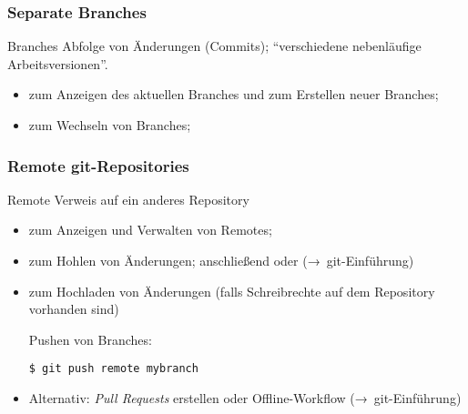 \documentclass{cms-kurs}
\begin{document}
\begin{frame}
  \frametitle{Separate Branches}

  \onslide<+->

  \begin{block}{Branches}
    Abfolge von Änderungen (Commits); \enquote{verschiedene nebenläufige
      Arbeitsversionen}.
  \end{block}

  \onslide<+->

  \begin{itemize}
  \item {} zum Anzeigen des aktuellen Branches und zum
    Erstellen neuer Branches;
  \item {} zum Wechseln von Branches;
  \end{itemize}

\end{frame}


\begin{frame}[fragile]
  \frametitle{Remote git-Repositories}

  \onslide<+->

  \begin{block}{Remote}
    Verweis auf ein anderes Repository
  \end{block}

  \onslide<+->

  \begin{itemize}
  \item {} zum Anzeigen und Verwalten von Remotes;
  \item {} zum Hohlen von Änderungen; anschließend 
    oder  (→ git-Einführung)
  \item {} zum Hochladen von Änderungen (falls Schreibrechte auf dem
    Repository vorhanden sind)

    \medskip

    Pushen von Branches:
\begin{lstlisting}
$ git push remote mybranch
\end{lstlisting}
  \item Alternativ: \emph{Pull Requests} erstellen oder Offline-Workflow
    (→ git-Einführung)
  \end{itemize}

\end{frame}
\end{document}
